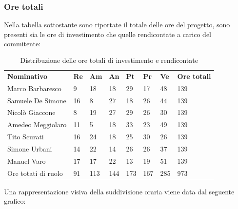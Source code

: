     \subsubsection{Ore totali}
        Nella tabella sottostante sono riportate il totale delle ore del progetto, sono presenti sia le ore di investimento che quelle rendicontate a carico del commitente:
            \begin{center}
                \begin{table}[ht!]
                    \centering\caption{Distribuzione delle ore totali di investimento e rendicontate}
                    \vspace{5px}
                    \renewcommand{\arraystretch}{1.8}
                    \begin{tabular}{p{100px} p{20px} p{20px} p{20px} p{20px} p{20px} p{20px} p{50px} }
                        \rowcolor{logo!70} \textbf{Nominativo} & \textbf{Re} & \textbf{Am} & \textbf{An} & \textbf{Pt} & \textbf{Pr} & \textbf{Ve} & \textbf{Ore totali}\\
                        Marco Barbaresco & 9 & 18 & 18 & 29 & 17 & 48 & 139\\
                        Samuele De Simone & 16 & 8 & 27 & 18 & 26 & 44 & 139\\
                        Nicolò Giaccone & 8 & 19 & 27 & 29 & 26 & 30 & 139\\
                        Amedeo Meggiolaro & 11 & 5 & 18 & 33 & 23 & 49 & 139\\
                        Tito Scurati & 16 & 24 & 18 & 25 & 30 & 26 & 139\\
                        Simone Urbani & 14 & 22 & 14 & 26 & 26 & 37 & 139\\
                        Manuel Varo & 17 & 17 & 22 & 13 & 19 & 51 & 139\\
                        Ore totati di ruolo & 91 & 113 & 144 & 173 & 167 & 285 & 973\\
                    \end{tabular}
                \end{table}
            \end{center}
            \pagebreak
            Una rappresentazione visiva della suddivisione oraria viene data dal seguente grafico:

